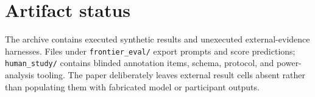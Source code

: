 \section{Artifact status}
The archive contains executed synthetic results and unexecuted external-evidence harnesses. Files under \texttt{frontier\_eval/} export prompts and score predictions; \texttt{human\_study/} contains blinded annotation items, schema, protocol, and power-analysis tooling. The paper deliberately leaves external result cells absent rather than populating them with fabricated model or participant outputs.

